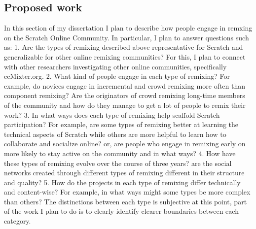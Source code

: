 \subsection{Proposed work}
In this section of my dissertation I plan to describe how people engage in remxing on the Scratch Online Community. 
In particular, I plan to answer questions such as:
1. Are the types of remixing described above representative for Scratch and generalizable for other online remixing communities? 
For this, I plan to connect with other researchers investigating other online communities, specifically ccMixter.org.
2. What kind of people engage in each type of remixing? For example, do novices engage in incremental and crowd remixing more often than component remixing? Are the originators of crowd remixing long-time members of the community and how do they manage to get a lot of people to remix their work?
3. In what ways does each type of remixing help scaffold Scratch participation? For example, are some types of remixing better at learning the technical aspects of Scratch while others are more helpful to learn how to collaborate and socialize online? or, are people who engage in remixing early on more likely to stay active on the community and in what ways?
4. How have these types of remixing evolve over the course of three years?
are the social networks created through different types of remixing different in their structure and quality?
5. How do the projects in each type of remixing differ technically and content-wise? For example, in what ways might some types be more complex than others?
The distinctions between each type is subjective at this point, part of the work I plan to do is to clearly identify clearer boundaries between each category.

